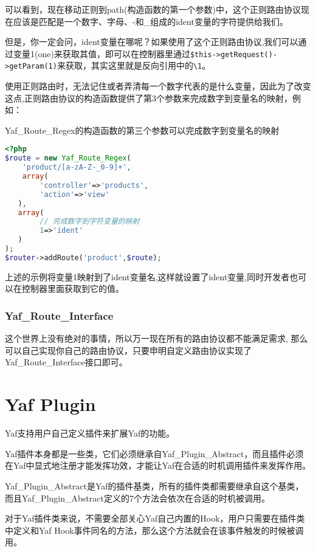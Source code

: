 可以看到，现在移动正则到path(构造函数的第一个参数)中，这个正则路由协议现在应该是匹配是一个数字、字母、-和\_组成的ident变量的字符提供给我们。

但是，你一定会问，ident变量在哪呢？如果使用了这个正则路由协议,我们可以通过变量1(one)来获取其值，即可以在控制器里通过\texttt{\$this->getRequest()->getParam(1)}来获取，其实这里就是反向引用中的\texttt{\textbackslash 1}。

使用正则路由时，无法记住或者弄清每一个数字代表的是什么变量，因此为了改变这点,正则路由协议的构造函数提供了第3个参数来完成数字到变量名的映射，例如：




\begin{example}
Yaf\_Route\_Regex的构造函数的第三个参数可以完成数字到变量名的映射
\begin{lstlisting}[language=PHP]
<?php
$route = new Yaf_Route_Regex(
    'product/[a-zA-Z-_0-9]+',
    array(
        'controller'=>'products',
        'action'=>'view'
   ),
   array(
        // 完成数字到字符变量的映射
        1=>'ident'
   )
);
$router->addRoute('product',$route);
\end{lstlisting}
\end{example}


上述的示例将变量1映射到了ident变量名,这样就设置了ident变量,同时开发者也可以在控制器里面获取到它的值。

\subsection{Yaf\_Route\_Interface}

这个世界上没有绝对的事情，所以万一现在所有的路由协议都不能满足需求, 那么可以自己实现你自己的路由协议，只要申明自定义路由协议实现了Yaf\_Route\_Interface接口即可。



\chapter{Yaf Plugin}

Yaf支持用户自己定义插件来扩展Yaf的功能。

Yaf插件本身都是一些类，它们必须继承自Yaf\_Plugin\_Abstract，而且插件必须在Yaf中显式地注册才能发挥功效，才能让Yaf在合适的时机调用插件来发挥作用。

Yaf\_Plugin\_Abstract是Yaf的插件基类，所有的插件类都需要继承自这个基类，而且Yaf\_Plugin\_Abstract定义的7个方法会依次在合适的时机被调用。

对于Yaf插件类来说，不需要全部关心Yaf自己内置的Hook，用户只需要在插件类中定义和Yaf Hook事件同名的方法，那么这个方法就会在该事件触发的时候被调用。

